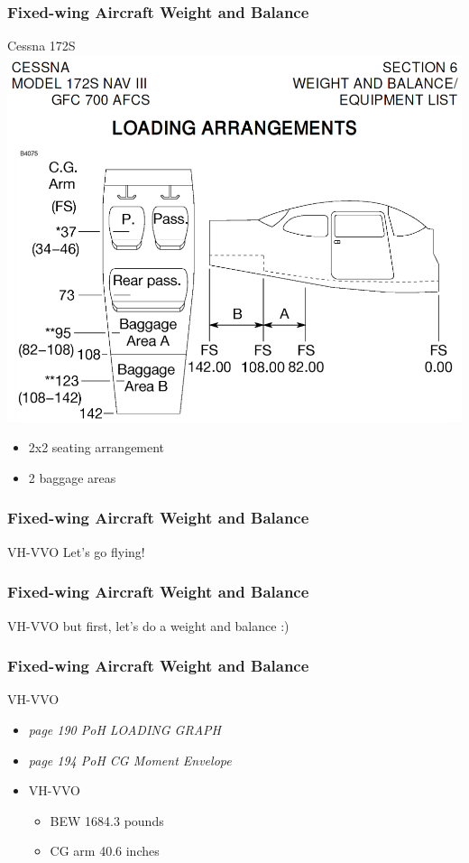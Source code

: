 \begin{frame}
\frametitle{Fixed-wing Aircraft Weight and Balance}
\begin{block}{Cessna 172S}
\includegraphics[height=0.5\textheight]{image/c172-loading.png}
\begin{itemize}
\item 2x2 seating arrangement
\item 2 baggage areas
\end{itemize}
\end{block}
\end{frame}

\begin{frame}
\frametitle{Fixed-wing Aircraft Weight and Balance}
\begin{block}{VH-VVO}
Let's go flying!
\end{block}
\end{frame}

\begin{frame}
\frametitle{Fixed-wing Aircraft Weight and Balance}
\begin{block}{VH-VVO}
but first, let's do a weight and balance :)
\end{block}
\end{frame}

\begin{frame}
\frametitle{Fixed-wing Aircraft Weight and Balance}
\begin{block}{VH-VVO}
\begin{itemize}
\item \tiny{\emph{page 190 PoH LOADING GRAPH}}
\item \tiny{\emph{page 194 PoH CG Moment Envelope}}
\item \tiny{VH-VVO}
  \begin{itemize}
  \item \tiny{BEW 1684.3 pounds}
  \item \tiny{CG arm 40.6 inches}
  \end{itemize}
\end{itemize}
\end{block}
\end{frame}

